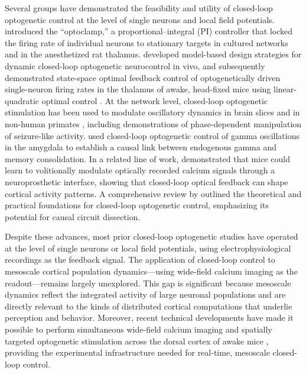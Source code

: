 \documentclass[11pt]{article}
\begin{document}
Several groups have demonstrated the feasibility and utility of closed-loop optogenetic control at the level of single neurons and local field potentials. \citet{newman2015optogenetic} introduced the ``optoclamp,'' a proportional--integral (PI) controller that locked the firing rate of individual neurons to stationary targets in cultured networks and in the anesthetized rat thalamus. \citet{bolus2018design} developed model-based design strategies for dynamic closed-loop optogenetic neurocontrol in vivo, and subsequently demonstrated state-space optimal feedback control of optogenetically driven single-neuron firing rates in the thalamus of awake, head-fixed mice using linear-quadratic optimal control \citep{bolus2021state}. At the network level, closed-loop optogenetic stimulation has been used to modulate oscillatory dynamics in brain slices and in non-human primates \citep{nicholson2018analogue, zaaimi2023closed}, including demonstrations of phase-dependent manipulation of seizure-like activity. \citet{kanta2019closed} used closed-loop optogenetic control of gamma oscillations in the amygdala to establish a causal link between endogenous gamma and memory consolidation. In a related line of work, \citet{clancy2014volitional} demonstrated that mice could learn to volitionally modulate optically recorded calcium signals through a neuroprosthetic interface, showing that closed-loop optical feedback can shape cortical activity patterns. A comprehensive review by \citet{grosenick2015closed} outlined the theoretical and practical foundations for closed-loop optogenetic control, emphasizing its potential for causal circuit dissection.

Despite these advances, most prior closed-loop optogenetic studies have operated at the level of single neurons or local field potentials, using electrophysiological recordings as the feedback signal. The application of closed-loop control to mesoscale cortical population dynamics---using wide-field calcium imaging as the readout---remains largely unexplored. This gap is significant because mesoscale dynamics reflect the integrated activity of large neuronal populations and are directly relevant to the kinds of distributed cortical computations that underlie perception and behavior. Moreover, recent technical developments have made it possible to perform simultaneous wide-field calcium imaging and spatially targeted optogenetic stimulation across the dorsal cortex of awake mice \citep{matveev2024simultaneous}, providing the experimental infrastructure needed for real-time, mesoscale closed-loop control.
\end{document}
